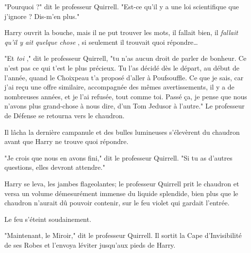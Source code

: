 "Pourquoi ?" dit le professeur Quirrell. "Est-ce qu'il y a une loi scientifique que j'ignore ? Dis-m'en plus."

Harry ouvrit la bouche, mais il ne put trouver les mots, il fallait bien, il \emph{fallait qu'il y ait quelque chose} , si seulement il trouvait quoi répondre…

"Et \emph{toi} ," dit le professeur Quirrell, "tu n'as aucun droit de parler de bonheur. Ce n'est pas ce qui t'est le plus précieux. Tu l'as décidé dès le départ, au début de l'année, quand le Choixpeau t'a proposé d'aller à Poufsouffle. Ce que je sais, car j'ai reçu une offre similaire, accompagnée des mêmes avertissements, il y a de nombreuses années, et je l'ai refusée, tout comme toi. Passé ça, je pense que nous n'avons plus grand-chose à nous dire, d'un Tom Jedusor à l'autre." Le professeur de Défense se retourna vers le chaudron.

Il lâcha la dernière campanule et des bulles lumineuses s'élevèrent du chaudron avant que Harry ne trouve quoi répondre.

"Je crois que nous en avons fini," dit le professeur Quirrell. "Si tu as d'autres questions, elles devront attendre."

Harry se leva, les jambes flageolantes; le professeur Quirrell prit le chaudron et versa un volume démesurément immense du liquide splendide, bien plus que le chaudron n'aurait dû pouvoir contenir, sur le feu violet qui gardait l'entrée.

Le feu s'éteint soudainement.

"Maintenant, le Miroir," dit le professeur Quirrell. Il sortit la Cape d'Invisibilité de ses Robes et l'envoya léviter jusqu'aux pieds de Harry.

